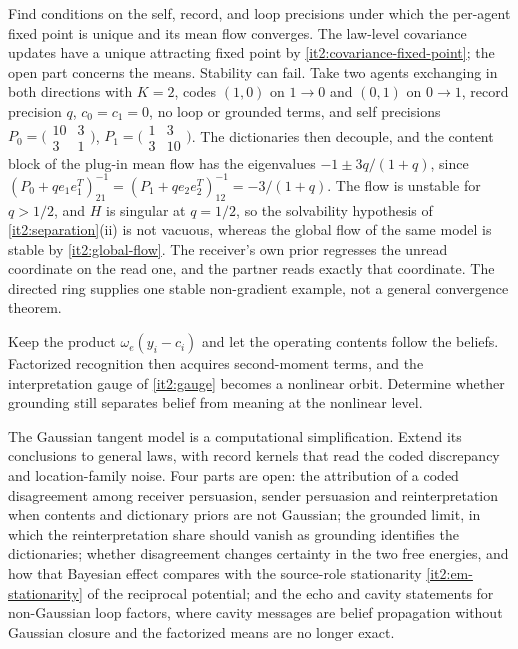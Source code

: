 Find conditions on the self, record, and loop precisions under which the per-agent fixed point is unique and its mean flow converges. The law-level covariance updates have a unique attracting fixed point by \cref{it2:covariance-fixed-point}; the open part concerns the means. Stability can fail. Take two agents exchanging in both directions with $K=2$, codes $(1,0)$ on $1\to0$ and $(0,1)$ on $0\to1$, record precision $q$, $c_0=c_1=0$, no loop or grounded terms, and self precisions $P_0=\bigl(\begin{smallmatrix}10&3\\3&1\end{smallmatrix}\bigr)$, $P_1=\bigl(\begin{smallmatrix}1&3\\3&10\end{smallmatrix}\bigr)$. The dictionaries then decouple, and the content block of the plug-in mean flow has the eigenvalues $-1\pm3q/(1+q)$, since $(P_0+qe_1e_1^T)^{-1}_{21}=(P_1+qe_2e_2^T)^{-1}_{12}=-3/(1+q)$. The flow is unstable for $q>1/2$, and $H$ is singular at $q=1/2$, so the solvability hypothesis of \cref{it2:separation}(ii) is not vacuous, whereas the global flow of the same model is stable by \cref{it2:global-flow}. The receiver's own prior regresses the unread coordinate on the read one, and the partner reads exactly that coordinate. The directed ring supplies one stable non-gradient example, not a general convergence theorem.

Keep the product $\omega_e(y_i-c_i)$ and let the operating contents follow the beliefs. Factorized recognition then acquires second-moment terms, and the interpretation gauge of \cref{it2:gauge} becomes a nonlinear orbit. Determine whether grounding still separates belief from meaning at the nonlinear level.

The Gaussian tangent model is a computational simplification. Extend its conclusions to general laws, with record kernels that read the coded discrepancy and location-family noise. Four parts are open: the attribution of a coded disagreement among receiver persuasion, sender persuasion and reinterpretation when contents and dictionary priors are not Gaussian; the grounded limit, in which the reinterpretation share should vanish as grounding identifies the dictionaries; whether disagreement changes certainty in the two free energies, and how that Bayesian effect compares with the source-role stationarity \cref{it2:em-stationarity} of the reciprocal potential; and the echo and cavity statements for non-Gaussian loop factors, where cavity messages are belief propagation without Gaussian closure and the factorized means are no longer exact.

